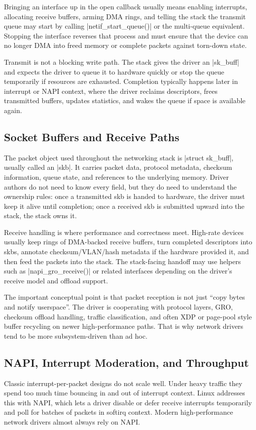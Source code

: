 \documentclass[10pt, oneside]{book}
\begin{document}
Bringing an interface up in the open callback usually means enabling interrupts,
allocating receive buffers, arming DMA rings, and telling the stack the transmit
queue may start by calling \cpp|netif_start_queue()| or the multi-queue
equivalent.
Stopping the interface reverses that process and must ensure that the device can
no longer DMA into freed memory or complete packets against torn-down state.

Transmit is not a blocking write path.
The stack gives the driver an \cpp|sk_buff| and expects the driver to queue it
to hardware quickly or stop the queue temporarily if resources are exhausted.
Completion typically happens later in interrupt or NAPI context, where the
driver reclaims descriptors, frees transmitted buffers, updates statistics, and
wakes the queue if space is available again.

\subsection{Socket Buffers and Receive Paths}
\label{sec:skb}
The packet object used throughout the networking stack is \cpp|struct sk_buff|,
usually called an \cpp|skb|.
It carries packet data, protocol metadata, checksum information, queue state,
and references to the underlying memory.
Driver authors do not need to know every field, but they do need to understand
the ownership rules: once a transmitted skb is handed to hardware, the driver
must keep it alive until completion; once a received skb is submitted upward
into the stack, the stack owns it.

Receive handling is where performance and correctness meet.
High-rate devices usually keep rings of DMA-backed receive buffers, turn
completed descriptors into skbs, annotate checksum/VLAN/hash metadata if the
hardware provided it, and then feed the packets into the stack.
The stack-facing handoff may use helpers such as \cpp|napi_gro_receive()| or
related interfaces depending on the driver's receive model and offload support.

The important conceptual point is that packet reception is not just ``copy bytes
and notify userspace''.
The driver is cooperating with protocol layers, GRO, checksum offload handling,
traffic classification, and often XDP or page-pool style buffer recycling on
newer high-performance paths.
That is why network drivers tend to be more subsystem-driven than ad hoc.

\subsection{NAPI, Interrupt Moderation, and Throughput}
\label{sec:napi}
Classic interrupt-per-packet designs do not scale well.
Under heavy traffic they spend too much time bouncing in and out of interrupt
context.
Linux addresses this with NAPI, which lets a driver disable or defer receive
interrupts temporarily and poll for batches of packets in softirq context.
Modern high-performance network drivers almost always rely on NAPI.
\end{document}
